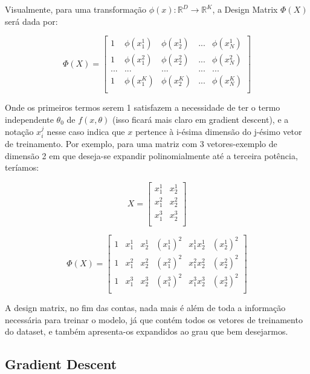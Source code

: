 \documentclass{article}
\begin{document}
Visualmente, para uma transformação $\phi(x): \mathbb{R}^{D} 
\rightarrow \mathbb{R}^{K}$, a Design Matrix $\Phi(X)$ será
dada por:

$$
\Phi(X) = 
\begin{bmatrix}
    1 & \phi(x_{1}^{1}) & \phi(x_{2}^{1}) & ... & \phi(x_{N}^{1}) \\
    1 & \phi(x_{1}^{2}) & \phi(x_{2}^{2}) & ... & \phi(x_{N}^{2}) \\
    ... & ... & ... & ... & ... \\
    1 & \phi(x_{1}^{K}) & \phi(x_{2}^{K}) & ... & \phi(x_{N}^{K}) \\
\end{bmatrix}
$$

Onde os primeiros termos serem 1 satisfazem a necessidade de 
ter o termo independente $\theta_{0}$ de $f(x, \theta)$
(isso ficará mais claro em gradient descent), e 
a notação $x_{i}^{j}$ nesse caso indica que $x$ pertence à 
i-ésima dimensão do j-ésimo vetor de treinamento. Por exemplo,
para uma matriz com  3 vetores-exemplo de dimensão 2 em que 
deseja-se expandir polinomialmente até a terceira potência, 
teríamos:

$$
X = 
\begin{bmatrix}
    x_{1}^{1} & x_{2}^{1} \\
    x_{1}^{2} & x_{2}^{2} \\
    x_{1}^{3} & x_{2}^{3} \\
\end{bmatrix}
$$

$$
\Phi(X) = 
\begin{bmatrix}
    1 & x_{1}^{1} & x_{2}^{1} & (x_{1}^{1})^{2} & x_{1}^{1}x_{2}^{1} & (x_{2}^{1})^{2} \\
    1 & x_{1}^{2} & x_{2}^{2} & (x_{1}^{2})^{2} & x_{1}^{2}x_{2}^{2} & (x_{2}^{2})^{2}\\
    1 & x_{1}^{3} & x_{2}^{3} & (x_{1}^{3})^{2} & x_{1}^{3}x_{2}^{3} & (x_{2}^{3})^{2}\\
\end{bmatrix}
$$

A design matrix, no fim das contas, nada mais é além de
toda a informação necessária para treinar o modelo, já
que contém todos os vetores de treinamento do dataset, e
também apresenta-os expandidos ao grau que bem desejarmos.

\subsection{Gradient Descent}
\end{document}
